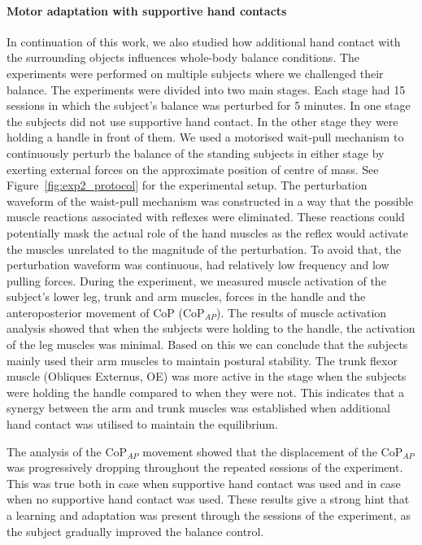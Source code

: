 \documentclass[final,5p,twocolumn]{elsarticle}
\begin{document}
\paragraph{Motor adaptation with supportive hand contacts} In continuation of this work, we also studied how additional hand contact with the surrounding objects influences whole-body balance conditions. The experiments were performed on multiple subjects where we challenged their balance. The experiments were divided into two main stages. Each stage had 15 sessions in which the subject's balance was perturbed for 5 minutes. In one stage the subjects did not use supportive hand contact. In the other stage they were holding a handle in front of them. We used a motorised wait-pull mechanism \cite{Peternel2013} to continuously perturb the balance of the standing subjects in either stage by exerting external forces on the approximate position of centre of mass. See Figure~\ref{fig:exp2_protocol} for the experimental setup. The perturbation waveform of the waist-pull mechanism was constructed in a way that the possible muscle reactions associated with reflexes were eliminated. These reactions could potentially mask the actual role of the hand muscles as the reflex would activate the muscles unrelated to the magnitude of the perturbation. To avoid that, the perturbation waveform was continuous, had relatively low frequency and low pulling forces. During the experiment, we measured muscle activation of the subject's lower leg, trunk and arm muscles, forces in the handle and the anteroposterior movement of CoP (CoP$_{AP}$). The results of muscle activation analysis showed that when the subjects were holding to the handle, the activation of the leg muscles was minimal. Based on this we can conclude that the subjects mainly used their arm muscles to maintain postural stability. The trunk flexor muscle (Obliques Externus, OE) was more active in the stage when the subjects were holding the handle compared to when they were not. This indicates that a synergy between the arm and trunk muscles was established when additional hand contact was utilised to maintain the equilibrium.

The analysis of the CoP$_{AP}$ movement showed that the displacement of the CoP$_{AP}$ was progressively dropping throughout the repeated sessions of the experiment. This was true both in case when supportive hand contact was used and in case when no supportive hand contact was used. These results give a strong hint that a learning and adaptation was present through the sessions of the experiment, as the subject gradually improved the balance control.
\end{document}

